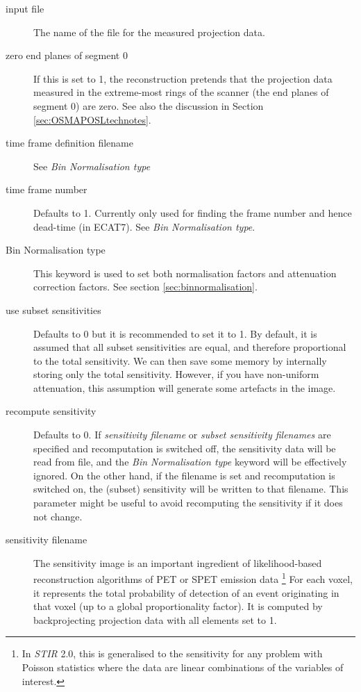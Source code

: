 \documentclass{article}
\begin{document}
\begin{description}

\item[input file]
The name of the file for the measured projection data. 


\item[zero end planes of segment 0]
If this is set to 1, the reconstruction pretends that the projection 
data measured in the extreme-most rings of the scanner (the end 
planes of segment 0) are zero. See also the discussion in Section 
\ref{sec:OSMAPOSLtechnotes}.


\item[time frame definition filename]
See \textit{Bin Normalisation type}

\item[time frame number]
Defaults to 1. Currently only used for finding the frame number and hence dead-time (in ECAT7).
See \textit{Bin Normalisation type}.

\item[Bin Normalisation type]
This keyword is used to set both normalisation factors and attenuation
correction factors. See section \ref{sec:binnormalisation}.

\item[use subset sensitivities]
Defaults to 0 but it is recommended to set it to 1.
By default, it is assumed that all subset sensitivities are equal, and therefore proportional 
to the total sensitivity. We can then save some memory by internally storing only the total sensitivity. 
However, if you have non-uniform attenuation, this assumption will generate some artefacts in the image.

\item[recompute sensitivity]
Defaults to 0. If \textit{sensitivity filename} or \textit{subset sensitivity filenames} 
are specified and recomputation is switched off, the sensitivity data will be read
from file, and the 
\textit{Bin Normalisation type} keyword will be effectively ignored.
On the other hand, if the filename is set and recomputation is switched on, the
(subset) sensitivity will be written to that filename. This parameter might be useful
to avoid recomputing the sensitivity if it does not change.

\item[sensitivity filename]
The sensitivity image is an important ingredient of 
likelihood-based reconstruction algorithms of PET or SPET emission data
\footnote{In \textit{STIR} 2.0, this is generalised to the sensitivity for
any problem with Poisson statistics where the data are linear
combinations of the variables of interest.}
For each voxel, it represents the total probability of detection of an 
event originating in that voxel (up to a global proportionality factor).
It is computed by backprojecting projection data with all elements set to 1.


\end{description}
\end{document}
